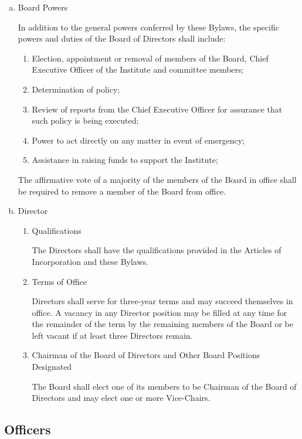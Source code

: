 \begin{enumerate}[(a)]
\item Board Powers

In addition to the general powers conferred by these Bylaws, the specific powers and duties of the Board of Directors shall include:

\begin{enumerate}
\item Election, appointment or removal of members of the Board, Chief Executive Officer of the Institute and committee members; 
\item Determination of policy;
\item Review of reports from the Chief Executive Officer for assurance that such policy is being executed;
\item Power to act directly on any matter in event of emergency;
\item Assistance in raising funds to support the Institute;
\end{enumerate}

The affirmative vote of a majority of the members of the Board in office shall be required to remove a member of the Board from office.

\item Director

\begin{enumerate}
\item Qualifications

The Directors shall have the qualifications provided in the Articles of Incorporation and these Bylaws. 

\item Terms of Office

Directors shall serve for three-year terms and may succeed themselves in office.  A vacancy in any Director position may be filled at any time for the remainder of the term by the remaining members of the Board or be left vacant if at least three Directors remain.

\item Chairman of the Board of Directors and Other Board Positions Designated

The Board shall elect one of its members to be Chairman of the Board of Directors and may elect one or more Vice-Chairs.

\end{enumerate}

\end{enumerate}

\subsection{Officers}

